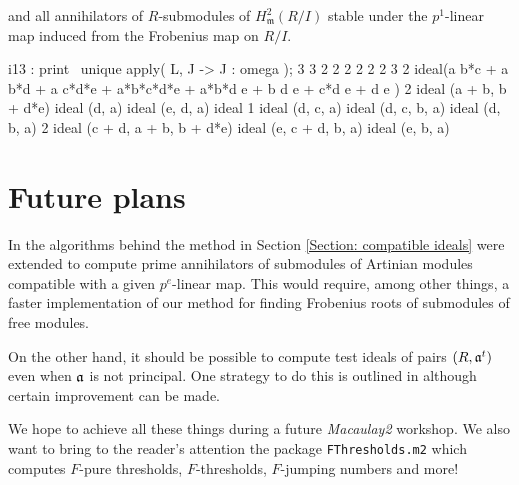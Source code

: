 \documentclass{amsart}
\begin{document}
\begin{example}
and all annihilators of $R$-submodules of $H^2_{\mathfrak{m}} (R/I)$ stable under the $p^1$-linear map induced from the Frobenius map on $R/I$.

\medskip
{\small
\begin{MyVerbatim}
i13 : print \ unique apply( L, J -> J : omega );
       3       3       2                         2     2 2       2 2    3 2
ideal(a b*c + a b*d + a c*d*e + a*b*c*d*e + a*b*d e + b d e + c*d e  + d e )
               2
ideal (a + b, b  + d*e)
ideal (d, a)
ideal (e, d, a)
ideal 1
ideal (d, c, a)
ideal (d, c, b, a)
ideal (d, b, a)
                      2
ideal (c + d, a + b, b  + d*e)
ideal (e, c + d, b, a)
ideal (e, b, a)
\end{MyVerbatim}
}
\medskip

\end{example}

\section{Future plans}

In \cite{KatzmanZhangAlgorithm} the algorithms behind the method in Section \ref{Section: compatible ideals} were extended
to compute prime annihilators of submodules of Artinian modules compatible with a given $p^{e}$-linear map.
This would require, among other things, a faster implementation of our method for finding Frobenius roots of submodules of free modules.

On the other hand, it should be possible to compute test ideals of pairs $(R, \mathfrak{a}^t)$ even when $\mathfrak{a}$ is not principal.  One strategy to do this is outlined in \cite{SchwedeTuckerTestIdealsOfNonPrincipal} although certain improvement can be made.

We hope to achieve all these things during a future \emph{Macaulay2} workshop.  We also want to bring to the reader's attention the package \texttt{FThresholds.m2} which computes $F$-pure thresholds, $F$-thresholds, $F$-jumping numbers and more!



\end{document}
